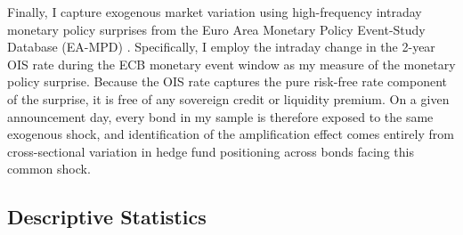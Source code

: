 \documentclass[english, 11pt, oneside]{article}
\begin{document}
Finally, I capture exogenous market variation using high-frequency intraday monetary policy surprises from the Euro Area Monetary Policy Event-Study Database (EA-MPD) \citep{altavilla2019}. Specifically, I employ the intraday change in the 2-year OIS rate during the ECB monetary event window as my measure of the monetary policy surprise. Because the OIS rate captures the pure risk-free rate component of the surprise, it is free of any sovereign credit or liquidity premium. On a given announcement day, every bond in my sample is therefore exposed to the same exogenous shock, and identification of the amplification effect comes entirely from cross-sectional variation in hedge fund positioning across bonds facing this common shock.

\subsection{Descriptive Statistics}
\end{document}
